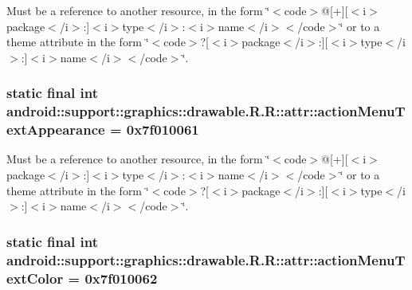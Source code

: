 Must be a reference to another resource, in the form \char`\"{}$<$code$>$@\mbox{[}+\mbox{]}\mbox{[}$<$i$>$package$<$/i$>$:\mbox{]}$<$i$>$type$<$/i$>$:$<$i$>$name$<$/i$>$$<$/code$>$\char`\"{} or to a theme attribute in the form \char`\"{}$<$code$>$?\mbox{[}$<$i$>$package$<$/i$>$:\mbox{]}\mbox{[}$<$i$>$type$<$/i$>$:\mbox{]}$<$i$>$name$<$/i$>$$<$/code$>$\char`\"{}. \hypertarget{classandroid_1_1support_1_1graphics_1_1drawable_1_1_r_1_1attr_6dcaa0df9e355f3ab25df67684511db9}{
\subsubsection[{actionMenuTextAppearance}]{\setlength{\rightskip}{0pt plus 5cm}static final int android::support::graphics::drawable.R.R::attr::actionMenuTextAppearance = 0x7f010061}}
\label{classandroid_1_1support_1_1graphics_1_1drawable_1_1_r_1_1attr_6dcaa0df9e355f3ab25df67684511db9}


Must be a reference to another resource, in the form \char`\"{}$<$code$>$@\mbox{[}+\mbox{]}\mbox{[}$<$i$>$package$<$/i$>$:\mbox{]}$<$i$>$type$<$/i$>$:$<$i$>$name$<$/i$>$$<$/code$>$\char`\"{} or to a theme attribute in the form \char`\"{}$<$code$>$?\mbox{[}$<$i$>$package$<$/i$>$:\mbox{]}\mbox{[}$<$i$>$type$<$/i$>$:\mbox{]}$<$i$>$name$<$/i$>$$<$/code$>$\char`\"{}. \hypertarget{classandroid_1_1support_1_1graphics_1_1drawable_1_1_r_1_1attr_d6d2219fb712254d24f94ab50dc59932}{
\subsubsection[{actionMenuTextColor}]{\setlength{\rightskip}{0pt plus 5cm}static final int android::support::graphics::drawable.R.R::attr::actionMenuTextColor = 0x7f010062}}
\label{classandroid_1_1support_1_1graphics_1_1drawable_1_1_r_1_1attr_d6d2219fb712254d24f94ab50dc59932}


